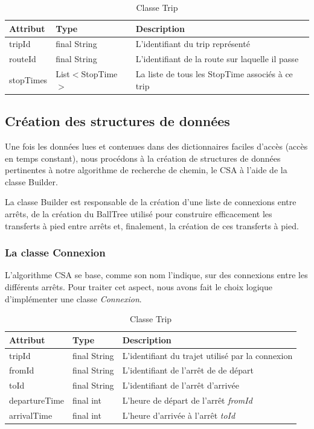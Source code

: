 \documentclass[12pt]{article}
\begin{document}
\begin{table}[h]
    \centering
    \begin{tabular}{|l|l|p{8cm}|}
    \hline
    \textbf{Attribut} & \textbf{Type} & \textbf{Description} \\
    \hline
    tripId & final String & L'identifiant du trip représenté \\
    routeId & final String & L'identifiant de la route sur laquelle il passe \\
    stopTimes & List$<$StopTime$>$ &  La liste de tous les StopTime associés à ce trip \\
    \hline
    \end{tabular}
    \caption{Classe Trip}
\end{table}

\subsection{Création des structures de données}
Une fois les données lues et contenues dans des dictionnaires faciles d'accès (accès en temps constant), nous procédons à la création de structures de données
pertinentes à notre algorithme de recherche de chemin, le CSA à l'aide de la classe Builder.

La classe Builder est responsable de la création d'une liste de connexions entre arrêts, de la création du BallTree utilisé pour construire efficacement les transferts à pied entre arrêts
et, finalement, la création de ces transferts à pied.

\subsubsection{La classe Connexion}
L'algorithme CSA se base, comme son nom l'indique, sur des connexions entre les différents arrêts. Pour traiter cet aspect, nous avons fait le choix logique
d'implémenter une classe \emph{Connexion}.

\begin{table}[h]
    \centering
    \begin{tabular}{|l|l|p{8cm}|}
    \hline
    \textbf{Attribut} & \textbf{Type} & \textbf{Description} \\
    \hline
    tripId & final String & L'identifiant du trajet utilisé par la connexion \\
    fromId & final String & L'identifiant de l'arrêt de de départ \\
    toId & final String &  L'identifiant de l'arrêt d'arrivée \\
    departureTime & final int & L'heure de départ de l'arrêt \emph{fromId} \\
    arrivalTime & final int & L'heure d'arrivée à l'arrêt \emph{toId} \\
    \hline
    \end{tabular}
    \caption{Classe Trip}
\end{table}
\end{document}
